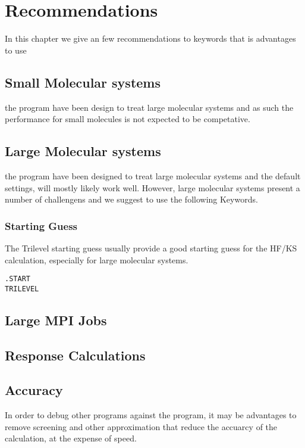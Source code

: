 \chapter{Recommendations }\label{recommendations}

In this chapter we give an few recommendations to keywords that is advantages to use 

\section{Small Molecular systems}

the {\lsdalton} program have been design to treat large molecular systems and as such the performance for small molecules is not expected to be competative.   

\section{Large Molecular systems}

the {\lsdalton} program have been designed to treat large molecular systems and the default 
settings, will mostly likely work well. However, large molecular systems present a number of 
challengens and we suggest to use the following Keywords.


\subsection{Starting Guess}
The Trilevel \cite{trilevel1, trilevel2} starting guess usually provide a good starting guess
for the HF/KS calculation, especially for large molecular systems. 
\begin{verbatim}
.START
TRILEVEL
\end{verbatim}

\section{Large MPI Jobs}


\section{Response Calculations}


\section{Accuracy}

In order to debug other programs against the {\lsdalton} program, it may be advantages to remove screening and other approximation that reduce the accuarcy of the calculation, at the expense of speed.

